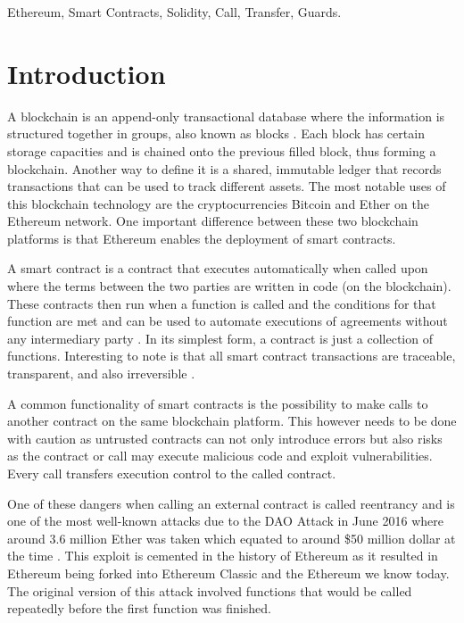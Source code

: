 \documentclass[10pt,conference]{IEEEtran}
\begin{document}
\begin{IEEEkeywords}
Ethereum,  Smart Contracts, Solidity,  Call,  Transfer,  Guards.
\end{IEEEkeywords}


\section{Introduction}

A blockchain is an append-only transactional database where the information is structured together in groups, also known as blocks \cite{smart_inspect, smarter}. Each block has certain storage capacities and is chained onto the previous filled block, thus forming a blockchain. Another way to define it is a shared, immutable ledger that records transactions that can be used to track different assets. The most notable uses of this blockchain technology are the cryptocurrencies Bitcoin\cite{article} and Ether \cite{ethereum, white_paper} on the Ethereum network. One important difference between these two blockchain platforms is that Ethereum enables the deployment of smart contracts.

A smart contract is a contract that executes automatically when called upon where the terms between the two parties are written in code (on the blockchain). These contracts then run when a function is called and the conditions for that function are met and can be used to automate executions of agreements without any intermediary party \cite{criminal, 10.1145/2993600.2993611, smarter}. In its simplest form, a contract is just a collection of functions. Interesting to note is that all smart contract transactions are traceable, transparent, and also irreversible \cite{smart_inspect, smarter}.

A common functionality of smart contracts is the possibility to make calls to another contract on the same blockchain platform. This however needs to be done with caution as untrusted contracts can not only introduce errors but also risks as the contract or call may execute malicious code and exploit vulnerabilities. Every call transfers execution control to the called contract.

One of these dangers when calling an external contract is called reentrancy and is one of the most well-known attacks due to the DAO Attack in June 2016 where around 3.6 million Ether was taken which equated to around \$50 million dollar at the time \cite{10.1007/978-3-662-54455-6_8}. This exploit is cemented in the history of Ethereum as it resulted in Ethereum being forked into Ethereum Classic and the Ethereum we know today.
The original version of this attack involved functions that would be called repeatedly before the first function was finished.
\end{document}
